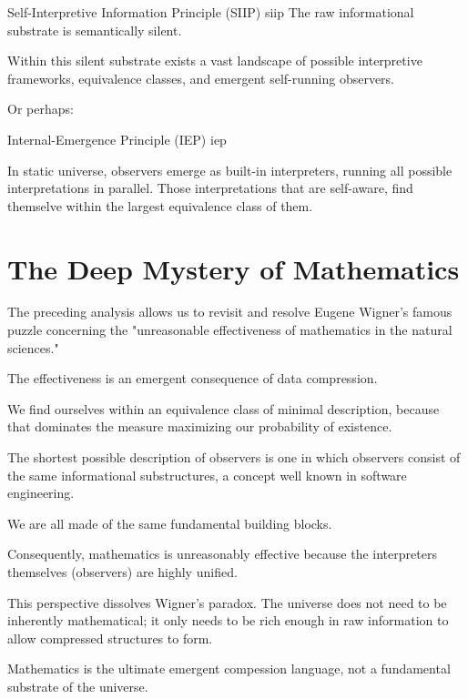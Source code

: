 \begin{principle}{Self-Interpretive Information Principle (SIIP)}
{siip}
The raw informational substrate is semantically silent.

Within this silent substrate exists a vast landscape of possible interpretive frameworks, equivalence classes, and emergent self-running observers.
\end{principle}


Or perhaps:

\begin{principle}{Internal-Emergence Principle (IEP)}
{iep}

In static universe, observers emerge as built-in interpreters, running all possible interpretations in parallel. Those interpretations that are self-aware, 
find themselve within the largest equivalence class of them. 

\end{principle}




\section{The Deep Mystery of Mathematics}

The preceding analysis allows us to revisit and resolve Eugene Wigner's famous puzzle concerning the "unreasonable effectiveness of mathematics in the natural sciences."

The effectiveness is an emergent consequence of data compression.

We find ourselves within an equivalence class of minimal description, because that dominates the measure  maximizing our probability of existence.

The shortest possible description of observers is one in which observers consist of the same informational substructures, a concept well known in software engineering.

We are all made of the same fundamental building blocks.

Consequently, mathematics is unreasonably effective because the interpreters themselves (observers) are highly unified.

This perspective dissolves Wigner's paradox. The universe does not need to be inherently mathematical; it only needs to be rich enough in raw information to allow compressed structures to form.

Mathematics is the ultimate emergent compession language, not a fundamental substrate of the universe.

